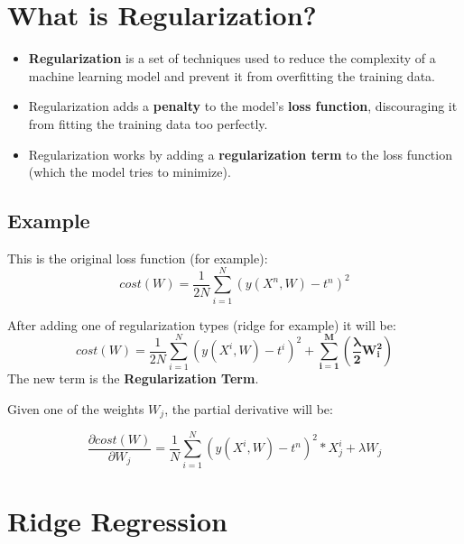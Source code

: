 \documentclass[20pt]{article}
\begin{document}
\section{What is Regularization?}

\begin{itemize}
    \item \textbf{Regularization} is a set of techniques used to reduce the complexity of a machine learning model and prevent it from overfitting the training data.
    \item Regularization adds a \textbf{penalty} to the model’s \textbf{loss function}, discouraging it from fitting the training data too perfectly.
    \item Regularization works by adding a \textbf{regularization term} to the loss function (which the model tries to minimize).
\end{itemize}

\subsection{Example}
This is the original loss function (for example):
\begin{equation}
    cost(W) = \frac{1}{2N} \sum_{i=1}^{N} \left( y(X^n, W) - t^n \right)^2
\end{equation}

After adding one of regularization types (ridge for example) it will be:
\begin{equation}
    cost(W) = \frac{1}{2N} \sum_{i=1}^{N} \left( y(X^i, W) - t^i \right)^2 + \mathbf{\sum_{i=1}^{M} \left (\frac{\lambda}{2} W_i^2 \right)}
\end{equation}
The new term is the \textbf{Regularization Term}.

Given one of the weights $W_j$, the partial derivative will be:

\begin{equation}
    \frac{\partial cost(W)}{\partial W_j} = \frac{1}{N} \sum_{i=1}^{N} \left( y(X^i, W) - t^n \right)^2 * X_j^i + \lambda W_j
\end{equation}


\section{Ridge Regression}
\end{document}
